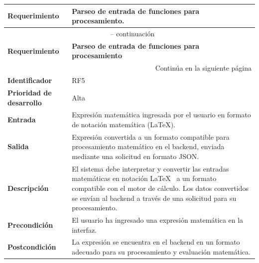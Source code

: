 \begin{longtable}{|m{3.5cm}|m{9.5cm}|}
	\hline
	\rowcolor{black!75} \color{white}\textbf{Requerimiento} & \color{white}\textbf{Parseo de entrada de funciones para procesamiento.} \\
	\hline
	\endfirsthead
	\multicolumn{2}{c}{{\tablename\ \thetable{} -- continuación}} \\
	\hline
	\rowcolor{black!75} \color{white}\textbf{Requerimiento} & \color{white}\textbf{Parseo de entrada de funciones para procesamiento} \\
	\hline
	\endhead
	\hline \multicolumn{2}{r}{{Continúa en la siguiente página}} \\
	\endfoot
	\hline
	\endlastfoot
	
	\textbf{Identificador} & RF5 \\
	\hline
	\textbf{Prioridad de desarrollo} & Alta \\
	\hline
	\textbf{Entrada} & Expresión matemática ingresada por el usuario en formato de notación matemática (\LaTeX). \\
	\hline
	\textbf{Salida} & Expresión convertida a un formato compatible para procesamiento matemático en el backend, enviada mediante una solicitud en formato JSON. \\
	\hline
	\textbf{Descripción} & El sistema debe interpretar y convertir las entradas matemáticas en notación \LaTeX~ a un formato compatible con el motor de cálculo. Los datos convertidos se envían al backend a través de una solicitud para su procesamiento. \\
	\hline
	\textbf{Precondición} & El usuario ha ingresado una expresión matemática en la interfaz. \\
	\hline
	\textbf{Postcondición} & La expresión se encuentra en el backend en un formato adecuado para su procesamiento y evaluación matemática. \\
	\hline
\end{longtable}
\caption{Requerimiento funcional No. 5} \label{tabla:RF5}
\vspace{0.5cm}

